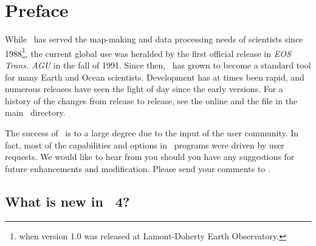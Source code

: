 %
%
\chapter{Preface} 
\thispagestyle{headings}

While \GMT\ has served the map-making and data processing needs of scientists since 1988\footnote{when
version 1.0 was released at Lamont-Doherty Earth Observatory.}, the current global use was
heralded by the first official release in {\it EOS Trans. AGU} in the fall of 1991.  Since then,
\GMT\ has grown to become a standard tool for many Earth and Ocean scientists.  Development
has at times been rapid, and numerous releases have seen the light of day since the early versions.
For a history of the changes from release to release, see the online
and the file  in the main \GMT\ directory.

The success of \GMT\ is to a large degree due to the input of the user community. In fact, most of the
capabilities and options in \GMT\ programs were driven by user requests.
We would like to hear from you should you have any suggestions for future enhancements and modification.
Please send your comments to
.

\section{What is new in \gmt\ 4?}


